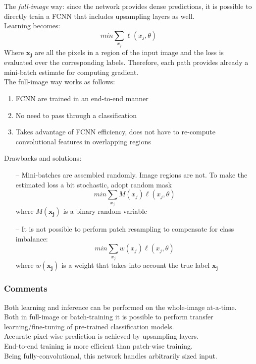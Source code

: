 The \textit{full-image} way: 
since the network provides dense predictions, it is possible to directly train a FCNN that includes upsampling layers as well.\\
Learning becomes: 
$$
min \sum_{x_{j}} \ell\left(x_{j}, \theta\right)
$$
Where $\boldsymbol{x_j}$ are all the pixels in a region of the input image and the loss is evaluated over the corresponding labels. Therefore, each path provides already a mini-batch estimate for computing gradient.\\
The full-image way works as follows:
\begin{enumerate}
    \item FCNN are trained in an end-to-end manner
    \item No need to pass through a classification
    \item Takes advantage of FCNN efficiency, does not have to re-compute convolutional features in overlapping regions
\end{enumerate}{}

Drawbacks and solutions: 
\begin{itemize}
    \item[--] Mini-batches are assembled  randomly. Image regions are not. To make the estimated loss a bit stochastic, adopt random mask
    $$
    min\sum_{x_{j}} M\left(x_{j}\right) \ell\left(x_{j}, \theta\right)
    $$
    where $M(\boldsymbol{x_j})$ is a binary random variable
    \item[--] It is not possible to perform patch resampling to compensate for class imbalance: 
    $$
    min \sum_{x_{j}} w\left(x_{j}\right) \ell\left(x_{j}, \theta\right)
    $$
    where $w(\boldsymbol{x_j})$ is a weight that takes into account the true label $\boldsymbol{x_j}$
\end{itemize}{}

\subsubsection{Comments}
Both learning and inference can be performed on the whole-image at-a-time. Both in full-image or batch-training it is possible to perform transfer learning/fine-tuning of pre-trained classification models. \\
Accurate pixel-wise prediction is achieved by upsampling layers.\\
End-to-end training is more efficient than patch-wise training. \\
Being fully-convolutional, this network handles arbitrarily sized input.

